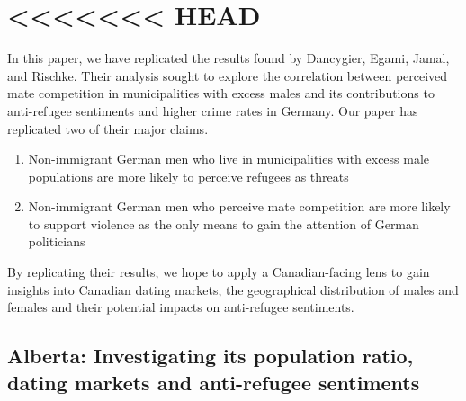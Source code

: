 \documentclass[
]{article}
\begin{document}
\hypertarget{head}{%
\section{\textless\textless\textless\textless\textless\textless\textless{}
HEAD}\label{head}}

In this paper, we have replicated the results found by Dancygier, Egami,
Jamal, and Rischke. Their analysis sought to explore the correlation
between perceived mate competition in municipalities with excess males
and its contributions to anti-refugee sentiments and higher crime rates
in Germany. Our paper has replicated two of their major claims.

\begin{enumerate}
\def\labelenumi{(\arabic{enumi})}
\item
  Non-immigrant German men who live in municipalities with excess male
  populations are more likely to perceive refugees as threats~
\item
  Non-immigrant German men who perceive mate competition are more likely
  to support violence as the only means to gain the attention of German
  politicians
\end{enumerate}

By replicating their results, we hope to apply a Canadian-facing lens to
gain insights into Canadian dating markets, the geographical
distribution of males and females and their potential impacts on
anti-refugee sentiments.~

\hypertarget{alberta-investigating-its-population-ratio-dating-markets-and-anti-refugee-sentiments}{%
\subsection{Alberta: Investigating its population ratio, dating markets
and anti-refugee
sentiments}\label{alberta-investigating-its-population-ratio-dating-markets-and-anti-refugee-sentiments}}
\end{document}
